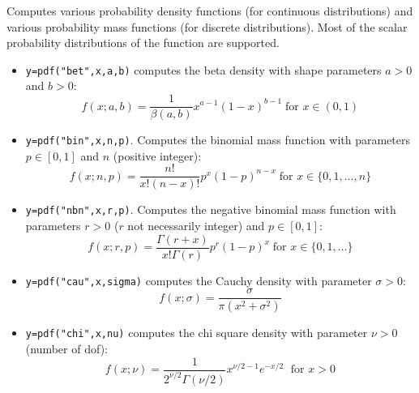 \begin{mandescription}
  Computes various probability density functions (for continuous
  distributions) 
  and various probability mass functions (for discrete distributions). Most of the
  scalar probability distributions of the 
  function are supported. 
\begin{itemize}

\item {}  \verb!y=pdf("bet",x,a,b)! computes the beta
  density with shape parameters $a > 0$ and $b > 0$:
$$
     f(x; a, b) =
        \frac{1}{\beta(a,b)} x^{a-1}(1-x)^{b-1} \;
        \mbox{for } x \in (0,1)
$$

\item {} \verb!y=pdf("bin",x,n,p)!. Computes
  the binomial mass function with parameters $p \in [0,1]$ and $n$
  (positive integer):
$$
     f(x; n, p) = \frac{ n! }{ x! (n-x)!} p^x (1-p)^{n-x} \;\mbox{for } x \in \{0,1,\dots,n\}
$$

\item {} \verb!y=pdf("nbn",x,r,p)!. Computes
  the negative binomial mass function with parameters $r > 0$ ($r$ not
  necessarily integer) and $p \in [0,1]$:
$$
     f(x; r, p) = \frac{ \Gamma(r+x) }{ x! \Gamma(r)} p^r (1-p)^x \;\mbox{for } x \in \{0,1,\dots\}
$$


\item {} \verb!y=pdf("cau",x,sigma)! computes the Cauchy
  density with parameter $\sigma > 0$:
$$
     f(x; \sigma) = \frac{ \sigma }{ \pi ( x^2 + \sigma^2 ) }
$$


\item {} \verb!y=pdf("chi",x,nu)! computes the chi square
  density with parameter $\nu > 0$ (number of dof):
$$
     f(x; \nu) = \frac{1}{2^{\nu/2} \Gamma(\nu/2)} x^{\nu/2-1} e^{-x/2}\; \mbox{ for } x > 0 
$$




\end{itemize}
\end{mandescription}
